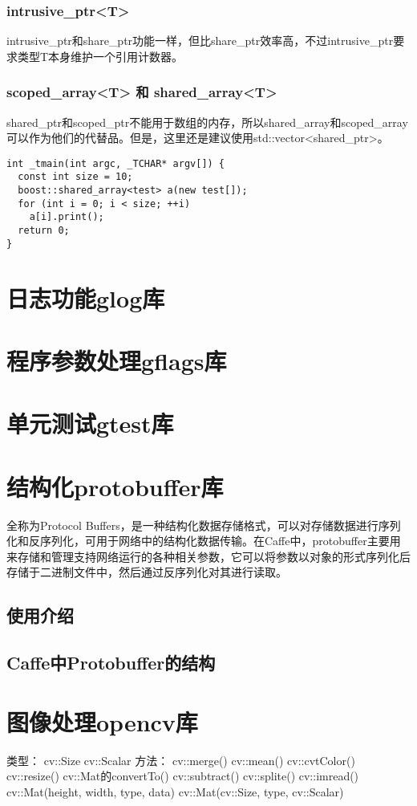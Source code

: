 \subsubsection{intrusive\_ptr<T>}
intrusive\_ptr和share\_ptr功能一样，但比share\_ptr效率高，不过intrusive\_ptr要求类型T本身维护一个引用计数器。
\subsubsection{scoped\_array<T> 和 shared\_array<T>}
shared\_ptr和scoped\_ptr不能用于数组的内存，所以shared\_array和scoped\_array可以作为他们的代替品。但是，这里还是建议使用std::vector<shared\_ptr>。
\begin{verbatim}
int _tmain(int argc, _TCHAR* argv[]) { 
  const int size = 10; 
  boost::shared_array<test> a(new test[]);
  for (int i = 0; i < size; ++i) 
    a[i].print();
  return 0; 
}
\end{verbatim}

\section{日志功能glog库}\label{deps/glog}
\section{程序参数处理gflags库}\label{deps/gflags}
\section{单元测试gtest库}
\section{结构化protobuffer库}\label{deps/protobuf}
全称为Protocol Buffers，是一种结构化数据存储格式，可以对存储数据进行序列化和反序列化，可用于网络中的结构化数据传输。在Caffe中，protobuffer主要用来存储和管理支持网络运行的各种相关参数，它可以将参数以对象的形式序列化后存储于二进制文件中，然后通过反序列化对其进行读取。
\subsection{使用介绍}
\subsection{Caffe中Protobuffer的结构}

\section{图像处理opencv库}
类型：
cv::Size
cv::Scalar
方法：
cv::merge()
cv::mean()
cv::cvtColor()
cv::resize()
cv::Mat的convertTo()
cv::subtract()
cv::splite()
cv::imread()
cv::Mat(height, width, type, data)
cv::Mat(cv::Size, type, cv::Scalar)

